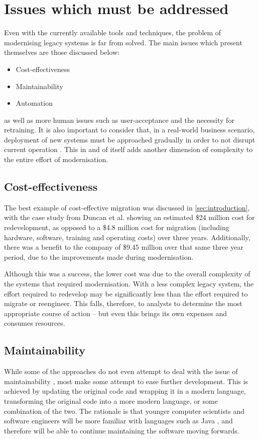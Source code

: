 \documentclass[12pt,journal,compsoc]{IEEEtran}
\begin{document}
\section{Issues which must be addressed}
\label{sec:issues}
Even with the currently available tools and techniques, the problem of modernising legacy systems is far from solved. The main issues which present themselves are those discussed below:
\begin{itemize}
\item Cost-effectiveness
\item Maintainability
\item Automation
\end{itemize}
as well as more human issues such as user-acceptance and the necessity for retraining. It is also important to consider that, in a real-world business scenario, deployment of new systems must be approached gradually in order to not disrupt current operation \cite{Sneed2008,Duncan1996,Almonaies2010}. This in and of itself adds another dimension of complexity to the entire effort of modernisation.

\subsection{Cost-effectiveness}
\label{subsec:costeffectiveness}
The best example of cost-effective migration was discussed in \autoref{sec:introduction}, with the case study from Duncan et al. \cite{Duncan1996} showing an estimated \$24 million cost for redevelopment, as opposed to a \$4.8 million cost for migration (including hardware, software, training and operating costs) over three years. Additionally, there was a benefit to the company of \$9.45 million over that same three year period, due to the improvements made during modernisation.

Although this was a success, the lower cost was due to the overall complexity of the systems that required modernisation. With a less complex legacy system, the effort required to redevelop may be significantly less than the effort required to migrate or reengineer. This falls, therefore, to analysts to determine the most appropriate course of action -- but even this brings its own expenses and consumes resources.

\subsection{Maintainability}
\label{subsec:maintainability}
While some of the approaches do not even attempt to deal with the issue of maintainability \cite{Stroulia2002}, most make some attempt to ease further development. This is achieved by updating the original code and wrapping it in a modern language, transforming the original code into a more modern language, or some combination of the two. The rationale is that younger computer scientists and software engineers will be more familiar with languages such as Java \cite{Sneed2013}, and therefore will be able to continue maintaining the software moving forwards.
\end{document}
